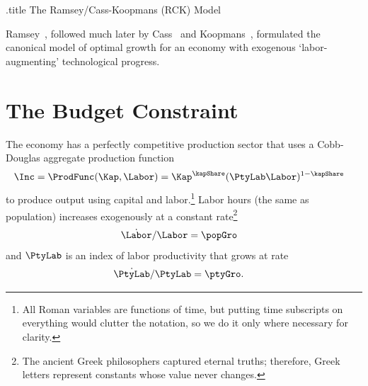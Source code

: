 \documentclass{handout}
\begin{document}
\handoutHeader

\begin{verbatimwrite}{\jobname.title}
  The Ramsey/Cass-Koopmans (RCK) Model
\end{verbatimwrite}

\handoutNameMake



\renewcommand{\cite}{\citeyearpar}

Ramsey~\cite{ramseySave}, followed much later by Cass~\cite{cass:growth} and Koopmans~\cite{koopmans:growth}, formulated the canonical model of optimal growth for an economy with exogenous `labor-augmenting' technological progress.

\section{The Budget Constraint}

The economy has a perfectly competitive production sector that uses a Cobb-Douglas aggregate production function 
\begin{equation}\begin{gathered}\begin{aligned}
                   \Inc & =  \ProdFunc(\Kap,\Labor) = \Kap^{\kapShare}(\PtyLab \Labor)^{1-\kapShare}
\end{aligned}\end{gathered}\end{equation}
to produce output using capital and labor.\footnote{All Roman variables are functions of time, but putting time subscripts on everything would clutter the notation, so we do it only where necessary for clarity.}  Labor hours (the same as population) increases exogenously at a constant rate\footnote{The ancient Greek philosophers captured eternal truths; therefore, Greek letters represent constants whose value never changes.}
\begin{equation}\begin{gathered}\begin{aligned}
  \dot{\Labor}/\Labor & =  \popGro
\end{aligned}\end{gathered}\end{equation}
and $\PtyLab $ is an index of labor productivity that grows at rate 
\begin{equation}\begin{gathered}\begin{aligned}
  \dot{\PtyLab }/\PtyLab  & =  \ptyGro. 
\end{aligned}\end{gathered}\end{equation}
\end{document}
